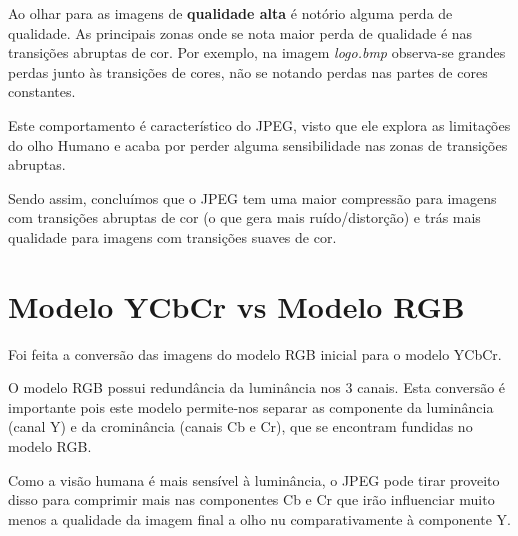 \documentclass[a4paper, 12pt]{article}
\begin{document}
        Ao olhar para as imagens de \textbf{qualidade alta} é notório alguma perda de qualidade. 
        As principais zonas onde se nota maior perda de qualidade é nas transições abruptas de cor.
        Por exemplo, na imagem \emph{logo.bmp} observa-se grandes perdas junto às transições de cores,
        não se notando perdas nas partes de cores constantes.

        Este comportamento é característico do JPEG, visto que ele explora as limitações do olho Humano
        e acaba por perder alguma sensibilidade nas zonas de transições abruptas.

        Sendo assim, concluímos que o JPEG tem uma maior compressão para imagens com transições abruptas
        de cor (o que gera mais ruído/distorção) e trás mais qualidade para imagens com transições suaves
        de cor.
          

\pagebreak
\section{Modelo YCbCr vs Modelo RGB}
    Foi feita a conversão das imagens do modelo RGB inicial para o modelo YCbCr. 
    
    O modelo RGB possui redundância da luminância nos 3 canais. Esta conversão é importante pois este
    modelo permite-nos separar as componente da luminância (canal Y)
    e da crominância (canais Cb e Cr), que se encontram fundidas no modelo RGB. 
    
    Como a visão humana é mais sensível à luminância, o JPEG pode tirar proveito disso para comprimir mais
    nas componentes Cb e Cr que irão influenciar muito menos a qualidade da imagem final a olho nu
    comparativamente à componente Y.
    
\end{document}

